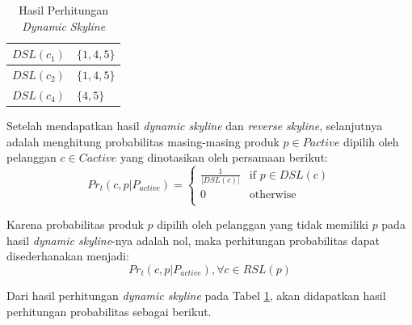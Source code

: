 \begin{table}[H]
	\small
	\centering
	\begin{tabular}{|p{2cm}|p{3cm}|}
		\hline
		$DSL(c_1)$ & $\{1, 4, 5\}$ \\ \hline
		$DSL(c_2)$ & $\{1, 4, 5\}$ \\ \hline
		$DSL(c_4)$ & $\{4, 5\}$\\ \hline
	\end{tabular} 
	\caption{Hasil Perhitungan \textit{Dynamic Skyline}}
	\label{tab:dsl-res}
\end{table}


Setelah mendapatkan hasil \textit{dynamic skyline} dan \textit{reverse skyline}, selanjutnya adalah menghitung probabilitas masing-masing produk $p \in P{active}$ dipilih oleh pelanggan $c \in C{active}$ yang dinotasikan oleh persamaan berikut:
\begin{equation}\label{eq:prob-ti}
Pr_t(c, p|P_{active}) = \left\{
						\begin{array}{ll}
						\frac{1}{|DSL(c)|} & \text{if } p \in DSL(c)\\
						0 & \text{otherwise}\\
						\end{array}
						\right.
\end{equation}

Karena probabilitas produk $p$ dipilih oleh pelanggan yang tidak memiliki $p$ pada hasil \textit{dynamic skyline}-nya adalah nol, maka perhitungan probabilitas dapat disederhanakan menjadi:
\begin{equation}\label{eq:prob-ti-rsl}
Pr_t(c, p|P_{active}), \forall c \in RSL(p)
\end{equation}

Dari hasil perhitungan \textit{dynamic skyline} pada Tabel \ref{tab:dsl-res}, akan didapatkan hasil perhitungan probabilitas sebagai berikut.

